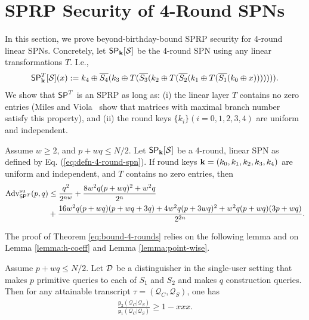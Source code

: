 
\section{SPRP Security of 4-Round SPNs}
\label{section:security of 4-round SPNs}

In this section, we prove beyond-birthday-bound SPRP security for 4-round linear SPNs. Concretely, let $\mathsf{SP}_{\mathbf{k}}[\mathcal{S}]$ be the 4-round SPN using any linear transformations $T$. I.e.,
%
\begin{align}
\mathsf{SP}_{\mathbf{k}}^T[\mathcal{S}](x):=k_4\oplus\overline{S_4}(k_3\oplus T(\overline{S_3}(k_2\oplus T(\overline{S_2}(k_1\oplus T(\overline{S_1}(k_0\oplus x))))))).
\label{eq:defn-4-round-spn}
\end{align}
%
We show that $\mathsf{SP}^T$ is an SPRP as long as: (i) the linear layer $T$ contains no zero entries (Miles and Viola~\cite{miles2015substitution} show that matrices with maximal branch number~\cite{daemen1995cipher} satisfy this property), and (ii) the round keys $\{k_i\}(i=0, 1, 2, 3, 4)$ are uniform and independent.


\begin{theorem}
\label{theorem:4-round-spn}

Assume $w\geq2$, and $p+wq\leq N/2$. Let $\mathsf{SP}_{\mathbf{k}}[\mathcal{S}]$ be a 4-round, linear SPN as defined by Eq. (\ref{eq:defn-4-round-spn}). If round keys $\mathbf{k}=(k_0,k_1,k_2,k_3,k_4)$ are uniform and independent, and $T$ contains no zero entries, then
%
\begin{align}
\operatorname{Adv}_{\mathsf{SP}^T}^{\mathrm{su}}(p, q) &\leq \frac{q^2}{2^{n w}} + \frac{8 w^2 q(p+wq)^2+w^2 q}{2^n}\\
&+ \frac{16 w^2 q(p+w q)(p+w q +3 q)+4 w^2 q(p+3 wq)^2+ w^2q(p+w q)(3p+w q)}{2^{2 n}}.
\label{eq:bound-4-rounds}
\end{align}
\end{theorem}
The proof of Theorem \ref{eq:bound-4-rounds} relies on the following lemma and on Lemma \ref{lemma:h-coeff} and Lemma \ref{lemma:point-wise}.


\begin{lemma}
	\label{lemma:proximity-4-round}
	
	Assume $p+wq\leq N/2$. Let $\mathcal{D}$ be a distinguisher in the single-user setting that makes $p$ primitive queries to each of $S_1$ and $S_2$ and makes $q$ construction queries. Then for any attainable
	transcript $\tau=(\mathcal{Q}_C,\mathcal{Q}_S)$, one has
	\begin{align}
	\frac{\mathsf{p}_{2}\left(\mathcal{Q}_{C} | \mathcal{Q}_{S}\right)}{\mathsf{p}_{1}\left(\mathcal{Q}_{C} | \mathcal{Q}_{S}\right)}
	\geq 1 - xxx.
	\label{eq:bound-proximity-4-round}
	\end{align}
\end{lemma}




